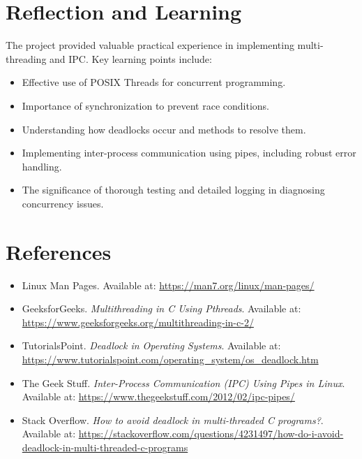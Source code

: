 \documentclass[11pt]{article}
\begin{document}
\section{Reflection and Learning}
The project provided valuable practical experience in implementing multi-threading and IPC. Key learning points include:
\begin{itemize}[itemsep=0pt]
    \item Effective use of POSIX Threads for concurrent programming.
    \item Importance of synchronization to prevent race conditions.
    \item Understanding how deadlocks occur and methods to resolve them.
    \item Implementing inter-process communication using pipes, including robust error handling.
    \item The significance of thorough testing and detailed logging in diagnosing concurrency issues.
\end{itemize}

\section{References}
\begin{itemize}[itemsep=0pt]
    \item Linux Man Pages. Available at: \url{https://man7.org/linux/man-pages/}
    \item GeeksforGeeks. \textit{Multithreading in C Using Pthreads}. Available at: \url{https://www.geeksforgeeks.org/multithreading-in-c-2/}
    \item TutorialsPoint. \textit{Deadlock in Operating Systems}. Available at: \url{https://www.tutorialspoint.com/operating_system/os_deadlock.htm}
    \item The Geek Stuff. \textit{Inter-Process Communication (IPC) Using Pipes in Linux}. Available at: \url{https://www.thegeekstuff.com/2012/02/ipc-pipes/}
    \item Stack Overflow. \textit{How to avoid deadlock in multi-threaded C programs?}. Available at: \url{https://stackoverflow.com/questions/4231497/how-do-i-avoid-deadlock-in-multi-threaded-c-programs}
\end{itemize}
\end{document}
